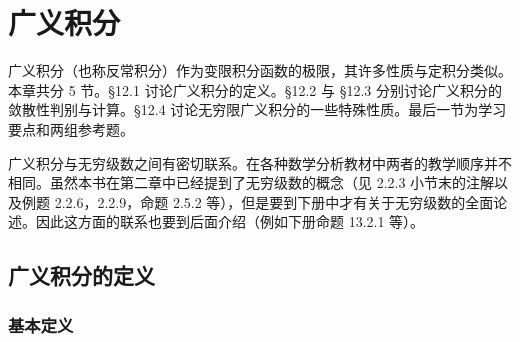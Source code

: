 \chapter{广义积分}

广义积分（也称反常积分）作为变限积分函数的极限，其许多性质与定积分类似。本章共分 5 节。§12.1 讨论广义积分的定义。§12.2 与 §12.3 分别讨论广义积分的敛散性判别与计算。§12.4 讨论无穷限广义积分的一些特殊性质。最后一节为学习要点和两组参考题。

广义积分与无穷级数之间有密切联系。在各种数学分析教材中两者的教学顺序并不相同。虽然本书在第二章中已经提到了无穷级数的概念（见 2.2.3 小节末的注解以及例题 2.2.6，2.2.9，命题 2.5.2 等），但是要到下册中才有关于无穷级数的全面论述。因此这方面的联系也要到后面介绍（例如下册命题 13.2.1 等）。

\section{广义积分的定义}

\subsection{基本定义}

